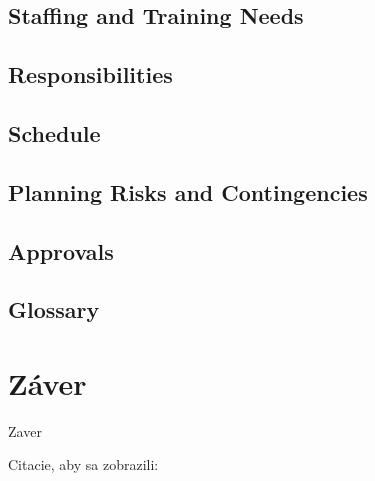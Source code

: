 \section{Staffing and Training Needs}
\section{Responsibilities}
\section{Schedule}
\section{Planning Risks and Contingencies}
\section{Approvals}
\section{Glossary}

\chapter{}

\chapter{Záver}
Zaver

Citacie, aby sa zobrazili: \cite{Testovani_softwaru} \cite{Software_testing} \cite{Software_testing_patton}
